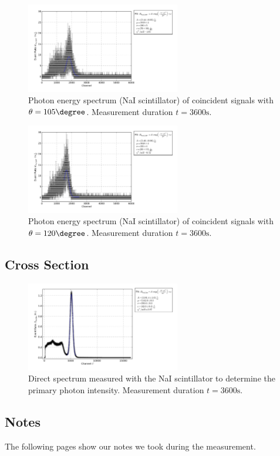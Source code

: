 \begin{figure}[h!]
  \centering
  \includegraphics[width=0.6\textwidth]{plots/naj_105.png}
  \caption{Photon energy spectrum (NaI scintillator) of coincident signals
  with $\theta=105\degree$. Measurement duration $t=3600\mathrm{s}$.}
  \label{fig:naj105}
\end{figure}
\begin{figure}[h!]
  \centering
  \includegraphics[width=0.6\textwidth]{plots/naj_120.png}
  \caption{Photon energy spectrum (NaI scintillator) of coincident signals
  with $\theta=120\degree$. Measurement duration $t=3600\mathrm{s}$.}
  \label{fig:naj120}
\end{figure}

\FloatBarrier
\subsection{Cross Section}
\begin{figure}[h!]
  \centering
  \includegraphics[width=0.6\textwidth]{plots/intensitaet.png}
  \caption{Direct \Cs spectrum measured with the NaI scintillator to determine
  the primary photon intensity. Measurement duration $t=3600\mathrm{s}$.}
  \label{fig:directI}
\end{figure}

\subsection{Notes}
The following pages show our notes we took during the measurement.


